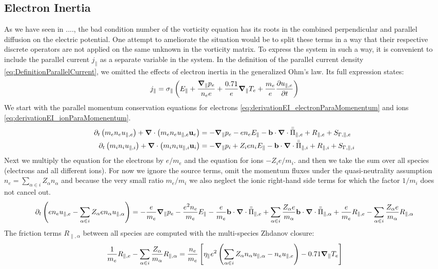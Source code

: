 \subsection{Electron Inertia}
\label{ssec:ModelElectronInertia}
As we have seen in ...., the bad condition number of the vorticity equation has its roots in the combined perpendicular and parallel diffusion on the electric potential. One attempt to ameliorate the situation would be to split these terms in a way that their respective discrete operators are not applied on the same unknown in the vorticity matrix. To express the system in such a way, it is convenient to include the parallel current $j_\parallel$ as a separate variable in the system. In the definition of the parallel current density \autoref{eq:DefinitionParallelCurrent}, we omitted the effects of electron inertia in the generalized Ohm's law. Its full expression states:
$$ 
j_\parallel = \sigma_\parallel \left(E_\parallel + \frac{\grad_\parallel p_e}{n_ee} + \frac{0.71}{e}\grad_\parallel T_e + \frac{m_e}{e} \pdv{u_{\parallel,e}}{t}\right) 
$$
We start with the parallel momentum conservation equations for electrons \ref{eq:derivationEI_electronParaMomenentum} and ions \ref{eq:derivationEI_ionParaMomenentum}.
\begin{align}
	\partial_t\left(m_en_eu_{\parallel,e}\right) + \grad\cdot\left(m_en_eu_{\parallel,e}\mathbf{u}_e\right) &= -\grad_\parallel p_e - en_eE_\parallel - \mathbf{b}\cdot\grad\cdot\bar{\bar{\Pi}}_{\parallel,e} + R_{\parallel,e} + S_{\Gamma,\parallel,e} \label{eq:derivationEI_electronParaMomenentum} \\
	\partial_t\left(m_in_iu_{\parallel,i}\right) + \grad\cdot\left(m_in_iu_{\parallel,i}\mathbf{u}_i\right) &= -\grad_\parallel p_i + Z_ien_iE_\parallel - \mathbf{b}\cdot\grad\cdot\bar{\bar{\Pi}}_{\parallel,i} + R_{\parallel,i} + S_{\Gamma,\parallel,i} \label{eq:derivationEI_ionParaMomenentum}
\end{align}
Next we multiply the equation for the electrons by $e/m_e$ and the equation for ions $-Z_ie/m_i$. and then we take the sum over all species (electrons and all different ions). For now we ignore the source terms, omit the momentum fluxes under the quasi-neutrality assumption $n_e = \sum_{\alpha \in i}Z_\alpha n_\alpha$ and because the very small ratio $m_e/m_i$ we also neglect the ionic right-hand side terms for which the factor $1/m_i$ does not cancel out.
$$
\partial_t\left(en_eu_{\parallel,e} - \sum_{\alpha \in i}Z_\alpha en_\alpha u_{\parallel,\alpha} \right) = -\frac{e}{m_e}\grad_\parallel p_e - \frac{e^2n_e}{m_e}E_\parallel - \frac{e}{m_e}\mathbf{b}\cdot\grad\cdot\bar{\bar{\Pi}}_{\parallel,e} + \sum_{\alpha \in i}\frac{Z_\alpha e}{m_\alpha} \mathbf{b}\cdot\grad\cdot\bar{\bar{\Pi}}_{\parallel,\alpha} + \frac{e}{m_e}R_{\parallel,e} - \sum_{\alpha \in i}\frac{Z_\alpha e}{m_\alpha} R_{\parallel,\alpha}
$$
The friction terms $R_{\parallel,\alpha}$ between all species are computed with the multi-species Zhdanov closure:
$$
\frac{1}{m_e}R_{\parallel,e} - \sum_{\alpha \in i}\frac{Z_\alpha}{m_\alpha} R_{\parallel,\alpha} = \frac{n_e}{m_e}\left[\eta_\parallel e^2\left(\sum_{\alpha \in i}Z_\alpha n_\alpha u_{\parallel,\alpha} - n_eu_{\parallel,e}\right) - 0.71\grad_\parallel T_e\right]
$$

